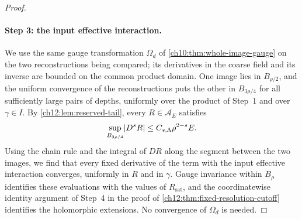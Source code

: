 \begin{proof}
\paragraph{Step 3: the input effective interaction.}
We use the same gauge transformation $\Omega_d$ of \cref{ch10:thm:whole-image-gauge} on the two reconstructions being compared; its derivatives in the coarse field and its inverse are bounded on the common product domain. One image lies in $B_{\rho/2}$, and the uniform convergence of the reconstructions puts the other in $B_{3\rho/4}$ for all sufficiently large pairs of depths, uniformly over the product of Step~1 and over $\gamma\in I$. By \cref{ch12:lem:reserved-tail}, every $R\in\mathcal A_E$ satisfies
\begin{equation}\label{ch12:eq:compact-coupling-inherited-jets}
 \sup_{B_{3\rho/4}}\lvert D^sR\rvert\le C_{s,\Lambda}\rho^{2-s}E .
\end{equation}
Using the chain rule and the integral of $DR$ along the segment between the two images, we find that every fixed derivative of the term with the input effective interaction converges, uniformly in $R$ and in $\gamma$. Gauge invariance within $B_\rho$ identifies these evaluations with the values of $R_{\mathrm{sat}}$, and the coordinatewise identity argument of Step~4 in the proof of \cref{ch12:thm:fixed-resolution-cutoff} identifies the holomorphic extensions. No convergence of $\Omega_d$ is needed.


\end{proof}
